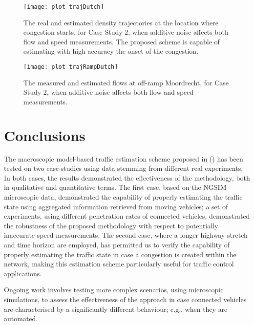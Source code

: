 \documentclass[titlepage,oneside,fleqn,12pt]{article}
\newcommand{\trbnum}[1]{{\it \citenum{#1}}}
\begin{document}
\begin{figure}
\begin{center}
	\texttt{[image: plot\_trajDutch]}
	\caption{The real and estimated density trajectories at the location where congestion starts, for Case Study 2, when additive noise affects both flow and speed measurements. The proposed scheme is capable of estimating with high accuracy the onset of the congestion.} 
	\label{fig:trajDutch}
\end{center}
\end{figure}

\begin{figure}
\begin{center}
	\texttt{[image: plot\_trajRampDutch]}
	\caption{The measured and estimated flows at off-ramp Moordrecht, for Case Study 2,  when additive noise affects both flow and speed measurements.} 
	\label{fig:trajRampDutch}
\end{center}
\end{figure}


\section{Conclusions} \label{sec:concl}

The macroscopic model-based traffic estimation scheme proposed in (\trbnum{Bekiaris2015}) has been tested on two case-studies using data stemming from different real experiments. In both cases, the results demonstrated the effectiveness of the methodology, both in qualitative and quantitative terms. The first case, based on the NGSIM microscopic data, demonstrated the capability of properly estimating the traffic state using aggregated information retrieved from moving vehicles; a set of experiments, using different penetration rates of connected vehicles, demonstrated the robustness of the proposed methodology with respect to potentially inaccurate speed measurements. The second case, where a longer highway stretch and time horizon are employed, has permitted us to verify the capability of properly estimating the traffic state in case a congestion is created within the network, making this estimation scheme particularly useful for traffic control applications. 

Ongoing work involves testing more complex scenarios, using microscopic simulations, to assess the effectiveness of the approach in case connected vehicles are characterised by a significantly different behaviour; e.g., when they are automated.
\end{document}
